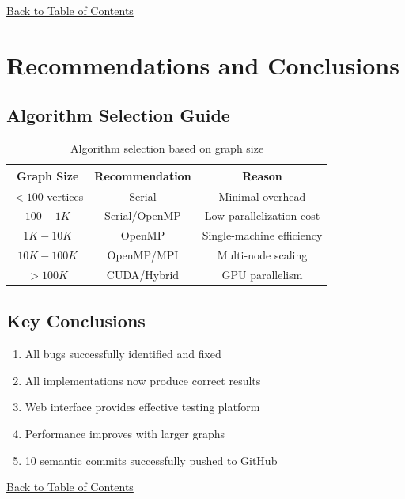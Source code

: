 \documentclass[12pt,a4paper]{article}
\begin{document}
\hyperref[contents]{\small Back to Table of Contents}

\newpage

\section{Recommendations and Conclusions}

\subsection{Algorithm Selection Guide}

\begin{table}[H]
    \centering
    \begin{tabular}{|c|c|c|}
    \hline
    \textbf{Graph Size} & \textbf{Recommendation} & \textbf{Reason} \\
    \hline
    $< 100$ vertices & Serial & Minimal overhead \\
    $100 - 1K$ & Serial/OpenMP & Low parallelization cost \\
    $1K - 10K$ & OpenMP & Single-machine efficiency \\
    $10K - 100K$ & OpenMP/MPI & Multi-node scaling \\
    $> 100K$ & CUDA/Hybrid & GPU parallelism \\
    \hline
    \end{tabular}
    \caption{Algorithm selection based on graph size}
    \label{tab:recommendations}
\end{table}

\subsection{Key Conclusions}

\begin{enumerate}
    \item All bugs successfully identified and fixed
    \item All implementations now produce correct results
    \item Web interface provides effective testing platform
    \item Performance improves with larger graphs
    \item 10 semantic commits successfully pushed to GitHub
\end{enumerate}

\hyperref[contents]{\small Back to Table of Contents}

\newpage
\end{document}
